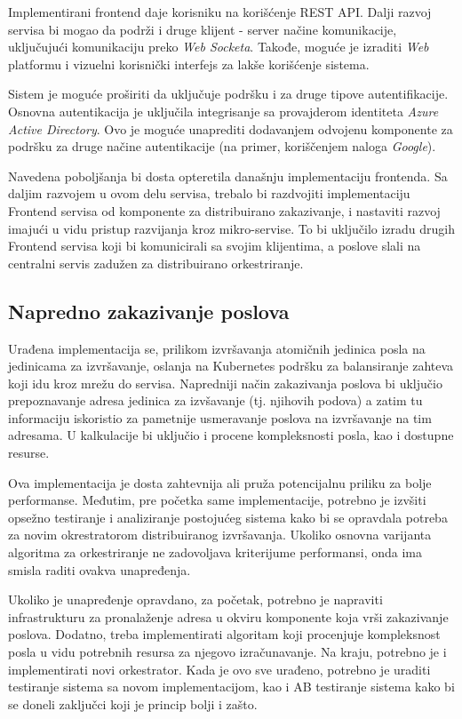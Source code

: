 \documentclass[12pt,oneside]{memoir}
\begin{document}
Implementirani frontend daje korisniku na korišćenje REST API. Dalji razvoj servisa bi mogao da podrži i druge klijent - server načine komunikacije, uključujući komunikaciju preko \emph{Web Socketa}. Takođe, moguće je izraditi \emph{Web} platformu i vizuelni korisnički interfejs za lakše korišćenje sistema.

Sistem je moguće proširiti da uključuje podršku i za druge tipove autentifikacije. Osnovna autentikacija je uključila integrisanje sa provajderom identiteta \emph{Azure Active Directory}. Ovo je moguće unaprediti dodavanjem odvojenu komponente za podršku za druge načine autentikacije (na primer, koriščenjem naloga \emph{Google}).

Navedena poboljšanja bi dosta opteretila današnju implementaciju frontenda. Sa daljim razvojem u ovom delu servisa, trebalo bi razdvojiti implementaciju Frontend servisa od komponente za distribuirano zakazivanje, i nastaviti razvoj imajući u vidu pristup razvijanja kroz mikro-servise. To bi uključilo izradu drugih Frontend servisa koji bi komunicirali sa svojim klijentima, a poslove slali na centralni servis zadužen za distribuirano orkestriranje.

\subsection{Napredno zakazivanje poslova}

Urađena implementacija se, prilikom izvršavanja atomičnih jedinica posla na jedinicama za izvršavanje, oslanja na Kubernetes podršku za balansiranje zahteva koji idu kroz mrežu do servisa. Napredniji način zakazivanja poslova bi uključio prepoznavanje adresa jedinica za izvšavanje (tj. njihovih podova) a zatim tu informaciju iskoristio za pametnije usmeravanje poslova na izvršavanje na tim adresama. U kalkulacije bi uključio i procene kompleksnosti posla, kao i dostupne resurse.

Ova implementacija je dosta zahtevnija ali pruža potencijalnu priliku za bolje performanse. Međutim, pre početka same implementacije, potrebno je izvšiti opsežno testiranje i analiziranje postojućeg sistema kako bi se opravdala potreba za novim okrestratorom distribuiranog izvršavanja. Ukoliko osnovna varijanta algoritma za orkestriranje ne zadovoljava kriterijume performansi, onda ima smisla raditi ovakva unapređenja.

Ukoliko je unapređenje opravdano, za početak, potrebno je napraviti infrastrukturu za pronalaženje adresa u okviru komponente koja vrši zakazivanje poslova. Dodatno, treba implementirati algoritam koji procenjuje kompleksnost posla u vidu potrebnih resursa za njegovo izračunavanje. Na kraju, potrebno je i implementirati novi orkestrator. Kada je ovo sve urađeno, potrebno je uraditi testiranje sistema sa novom implementacijom, kao i AB testiranje sistema kako bi se doneli zaključci koji je princip bolji i zašto.
\end{document}
